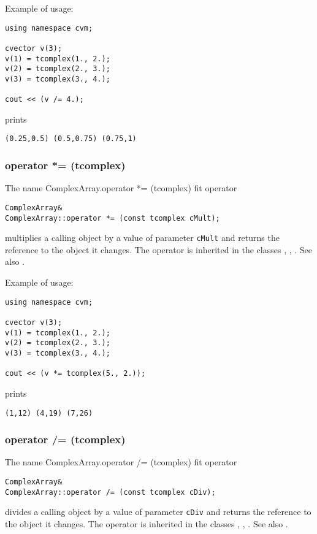 Example of usage:
\begin{verbatim}
using namespace cvm;

cvector v(3);
v(1) = tcomplex(1., 2.);
v(2) = tcomplex(2., 3.);
v(3) = tcomplex(3., 4.);

cout << (v /= 4.);
\end{verbatim}
prints
\begin{verbatim}
(0.25,0.5) (0.5,0.75) (0.75,1)
\end{verbatim}
\newpage



\subsubsection{operator *= (tcomplex)}
The%
\pdfdest name {ComplexArray.operator *= (tcomplex)} fit{ }
operator
\begin{verbatim}
ComplexArray&
ComplexArray::operator *= (const tcomplex cMult);
\end{verbatim}
multiplies a calling object by a value of
parameter \verb"cMult" and returns the reference to
the object it changes.
The operator is inherited in the classes
,
,
.
See also .

Example of usage:
\begin{verbatim}
using namespace cvm;

cvector v(3);
v(1) = tcomplex(1., 2.);
v(2) = tcomplex(2., 3.);
v(3) = tcomplex(3., 4.);

cout << (v *= tcomplex(5., 2.));
\end{verbatim}
prints
\begin{verbatim}
(1,12) (4,19) (7,26)
\end{verbatim}
\newpage




\subsubsection{operator /= (tcomplex)}
The%
\pdfdest name {ComplexArray.operator /= (tcomplex)} fit{ }
operator
\begin{verbatim}
ComplexArray&
ComplexArray::operator /= (const tcomplex cDiv);
\end{verbatim}
divides a calling object by a value of
parameter \verb"cDiv" and returns the reference to
the object it changes.
The operator is inherited in the classes
,
,
.
See also .

